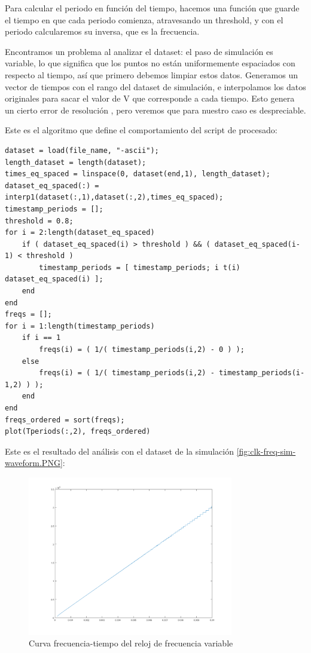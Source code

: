\documentclass[12pt]{report} %
\begin{document}
	Para calcular el periodo en función del tiempo, hacemos una función que guarde el tiempo en que cada periodo comienza, atravesando un threshold, y con el periodo calcularemos su inversa, que es la frecuencia.
	
	Encontramos un problema al analizar el dataset: el paso de simulación es variable, lo que significa que los puntos no están uniformemente espaciados con respecto al tiempo, así que primero debemos limpiar estos datos. Generamos un vector de tiempos con el rango del dataset de simulación, e interpolamos los datos originales para sacar el valor de V que corresponde a cada tiempo. Esto genera un cierto error de resolución %
	, pero veremos que para nuestro caso es despreciable.
	
	Este es el algoritmo que define el comportamiento del script de procesado:
	
	\begin{lstlisting}
dataset = load(file_name, "-ascii");
length_dataset = length(dataset);
times_eq_spaced = linspace(0, dataset(end,1), length_dataset);
dataset_eq_spaced(:) = interp1(dataset(:,1),dataset(:,2),times_eq_spaced);
timestamp_periods = [];
threshold = 0.8;
for i = 2:length(dataset_eq_spaced)
	if ( dataset_eq_spaced(i) > threshold ) && ( dataset_eq_spaced(i-1) < threshold )
		timestamp_periods = [ timestamp_periods; i t(i) dataset_eq_spaced(i) ];
	end
end
freqs = [];
for i = 1:length(timestamp_periods)
	if i == 1
		freqs(i) = ( 1/( timestamp_periods(i,2) - 0 ) );
	else
		freqs(i) = ( 1/( timestamp_periods(i,2) - timestamp_periods(i-1,2) ) );
	end
end
freqs_ordered = sort(freqs);
plot(Tperiods(:,2), freqs_ordered)
	\end{lstlisting} 

	Este es el resultado del análisis con el dataset de la simulación \ref{fig:clk-freq-sim-waveform.PNG}:
	
	\begin{figure}[H]
		\includegraphics[width=0.8\textwidth]{ml-clk-freq-curve.png}
		\caption[Curva frecuencia-tiempo del reloj de frecuencia variable]{Curva frecuencia-tiempo del reloj de frecuencia variable}
		\label{fig:ml-clk-freq-curve.png}
	\end{figure}
\end{document}
